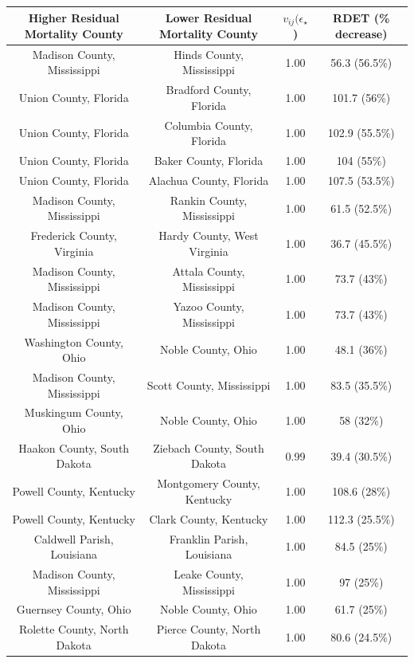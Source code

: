 \begin{longtable}{cccc}
  \toprule
Higher Residual Mortality County & Lower Residual Mortality County & $v_{ij}(\epsilon_{\star}$) & RDET (\% decrease) \\ 
  \midrule
Madison County, Mississippi & Hinds County, Mississippi & 1.00 & 56.3 (56.5\%) \\ 
  Union County, Florida & Bradford County, Florida & 1.00 & 101.7 (56\%) \\ 
  Union County, Florida & Columbia County, Florida & 1.00 & 102.9 (55.5\%) \\ 
  Union County, Florida & Baker County, Florida & 1.00 & 104 (55\%) \\ 
  Union County, Florida & Alachua County, Florida & 1.00 & 107.5 (53.5\%) \\ 
  Madison County, Mississippi & Rankin County, Mississippi & 1.00 & 61.5 (52.5\%) \\ 
  Frederick County, Virginia & Hardy County, West Virginia & 1.00 & 36.7 (45.5\%) \\ 
  Madison County, Mississippi & Attala County, Mississippi & 1.00 & 73.7 (43\%) \\ 
  Madison County, Mississippi & Yazoo County, Mississippi & 1.00 & 73.7 (43\%) \\ 
  Washington County, Ohio & Noble County, Ohio & 1.00 & 48.1 (36\%) \\ 
  Madison County, Mississippi & Scott County, Mississippi & 1.00 & 83.5 (35.5\%) \\ 
  Muskingum County, Ohio & Noble County, Ohio & 1.00 & 58 (32\%) \\ 
  Haakon County, South Dakota & Ziebach County, South Dakota & 0.99 & 39.4 (30.5\%) \\ 
  Powell County, Kentucky & Montgomery County, Kentucky & 1.00 & 108.6 (28\%) \\ 
  Powell County, Kentucky & Clark County, Kentucky & 1.00 & 112.3 (25.5\%) \\ 
  Caldwell Parish, Louisiana & Franklin Parish, Louisiana & 1.00 & 84.5 (25\%) \\ 
  Madison County, Mississippi & Leake County, Mississippi & 1.00 & 97 (25\%) \\ 
  Guernsey County, Ohio & Noble County, Ohio & 1.00 & 61.7 (25\%) \\ 
  Rolette County, North Dakota & Pierce County, North Dakota & 1.00 & 80.6 (24.5\%) \\ 

\end{longtable}
